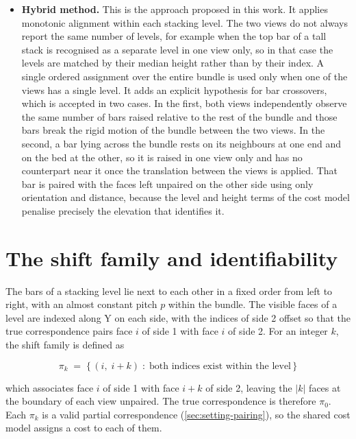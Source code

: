 \documentclass[a4paper, 12pt, twoside]{book}
\begin{document}
\begin{itemize}
\item \textbf{Hybrid method.} This is the approach proposed in this work. It applies monotonic alignment within each stacking level. The two views do not always report the same number of levels, for example when the top bar of a tall stack is recognised as a separate level in one view only, so in that case the levels are matched by their median height rather than by their index. A single ordered assignment over the entire bundle is used only when one of the views has a single level. It adds an explicit hypothesis for bar crossovers, which is accepted in two cases. In the first, both views independently observe the same number of bars raised relative to the rest of the bundle and those bars break the rigid motion of the bundle between the two views. In the second, a bar lying across the bundle rests on its neighbours at one end and on the bed at the other, so it is raised in one view only and has no counterpart near it once the translation between the views is applied. That bar is paired with the faces left unpaired on the other side using only orientation and distance, because the level and height terms of the cost model penalise precisely the elevation that identifies it.
\end{itemize}

\section{The shift family and identifiability}
\label{sec:setting-shift}

The bars of a stacking level lie next to each other in a fixed order from left to right, with an almost constant pitch $p$ within the bundle. The visible faces of a level are indexed along Y on each side, with the indices of side 2 offset so that the true correspondence pairs face $i$ of side 1 with face $i$ of side 2. For an integer $k$, the shift family is defined as

\begin{equation}
\pi_k \;=\; \{\, (i,\; i+k) \;:\; \text{both indices exist within the level} \,\}
\label{eq:shift}
\end{equation}

which associates face $i$ of side 1 with face $i+k$ of side 2, leaving the $\vert{}k\vert{}$ faces at the boundary of each view unpaired. The true correspondence is therefore $\pi_0$. Each $\pi_k$ is a valid partial correspondence (\cref{sec:setting-pairing}), so the shared cost model assigns a cost to each of them.
\end{document}
